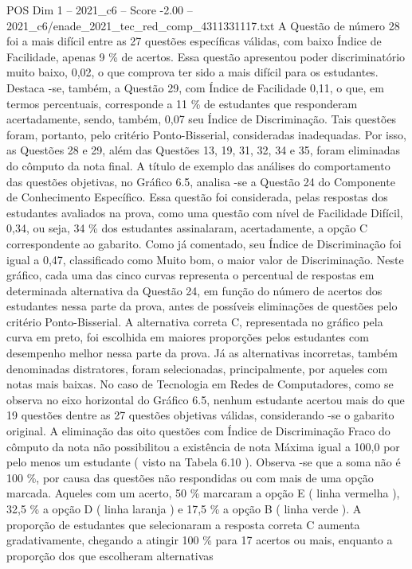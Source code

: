 \begin{textsample}{POS Dim 1 – 2021\_c6 – Score -2.00 – 2021\_c6/enade\_2021\_tec\_red\_comp\_4311331117.txt}
A Questão de número 28 foi a mais difícil entre as 27 questões específicas válidas, com baixo Índice de Facilidade, apenas 9 \% de acertos.
Essa questão apresentou poder discriminatório muito baixo, 0,02, o que comprova ter sido a mais difícil para os estudantes.
Destaca -se, também, a Questão 29, com Índice de Facilidade 0,11, o que, em termos percentuais, corresponde a 11 \% de estudantes que responderam acertadamente, sendo, também, 0,07 seu Índice de Discriminação.
Tais questões foram, portanto, pelo critério Ponto-Bisserial, consideradas inadequadas.
Por isso, as Questões 28 e 29, além das Questões 13, 19, 31, 32, 34 e 35, foram eliminadas do cômputo da nota final.
A título de exemplo das análises do comportamento das questões objetivas, no Gráfico 6.5, analisa -se a Questão 24 do Componente de Conhecimento Específico.
Essa questão foi considerada, pelas respostas dos estudantes avaliados na prova, como uma questão com nível de Facilidade Difícil, 0,34, ou seja, 34 \% dos estudantes assinalaram, acertadamente, a opção C correspondente ao gabarito.
Como já comentado, seu Índice de Discriminação foi igual a 0,47, classificado como Muito bom, o maior valor de Discriminação.
Neste gráfico, cada uma das cinco curvas representa o percentual de respostas em determinada alternativa da Questão 24, em função do número de acertos dos estudantes nessa parte da prova, antes de possíveis eliminações de questões pelo critério Ponto-Bisserial.
A alternativa correta C, representada no gráfico pela curva em preto, foi escolhida em maiores proporções pelos estudantes com desempenho melhor nessa parte da prova.
Já as alternativas incorretas, também denominadas distratores, foram selecionadas, principalmente, por aqueles com notas mais baixas.
No caso de Tecnologia em Redes de Computadores, como se observa no eixo horizontal do Gráfico 6.5, nenhum estudante acertou mais do que 19 questões dentre as 27 questões objetivas válidas, considerando -se o gabarito original.
A eliminação das oito questões com Índice de Discriminação Fraco do cômputo da nota não possibilitou a existência de nota Máxima igual a 100,0 por pelo menos um estudante ( visto na Tabela 6.10 ).
Observa -se que a soma não é 100 \%, por causa das questões não respondidas ou com mais de uma opção marcada.
Aqueles com um acerto, 50 \% marcaram a opção E ( linha vermelha ), 32,5 \% a opção D ( linha laranja ) e 17,5 \% a opção B ( linha verde ).
A proporção de estudantes que selecionaram a resposta correta C aumenta gradativamente, chegando a atingir 100 \% para 17 acertos ou mais, enquanto a proporção dos que escolheram alternativas

\end{textsample}
